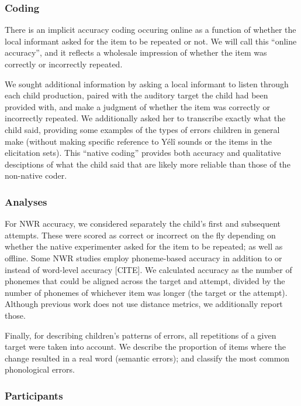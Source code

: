 \documentclass[english,,man,floatsintext]{apa6}
\begin{document}
\hypertarget{coding}{%
\subsubsection{Coding}\label{coding}}

There is an implicit accuracy coding occuring online as a function of whether the local informant asked for the item to be repeated or not. We will call this \enquote{online accuracy}, and it reflects a wholesale impression of whether the item was correctly or incorrectly repeated.

We sought additional information by asking a local informant to listen through each child production, paired with the auditory target the child had been provided with, and make a judgment of whether the item was correctly or incorrectly repeated. We additionally asked her to transcribe exactly what the child said, providing some examples of the types of errors children in general make (without making specific reference to Yélî sounds or the items in the elicitation sets). This \enquote{native coding} provides both accuracy and qualitative desciptions of what the child said that are likely more reliable than those of the non-native coder.

\hypertarget{analyses}{%
\subsubsection{Analyses}\label{analyses}}

For NWR accuracy, we considered separately the child's first and subsequent attempts. These were scored as correct or incorrect on the fly depending on whether the native experimenter asked for the item to be repeated; as well as offline. Some NWR studies employ phoneme-based accuracy in addition to or instead of word-level accuracy {[}CITE{]}. We calculated accuracy as the number of phonemes that could be aligned across the target and attempt, divided by the number of phonemes of whichever item was longer (the target or the attempt). Although previous work does not use distance metrics, we additionally report those.

Finally, for describing children's patterns of errors, all repetitions of a given target were taken into account. We describe the proportion of items where the change resulted in a real word (semantic errors); and classify the most common phonological errors.

\hypertarget{participants}{%
\subsubsection{Participants}\label{participants}}
\end{document}
